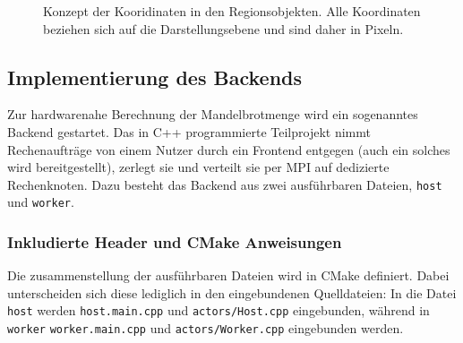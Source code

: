 \begin{figure}
	
\end{figure}
\begin{figure}
	\caption{Konzept der Kooridinaten in den Regionsobjekten. Alle Koordinaten beziehen sich auf die Darstellungsebene und sind daher in Pixeln.}
	\label{fig:concept_coordinates}
\end{figure}


\subsection{Implementierung des Backends}

Zur hardwarenahe Berechnung der Mandelbrotmenge wird ein sogenanntes Backend gestartet.
Das in C++ programmierte Teilprojekt nimmt Rechenaufträge von einem Nutzer durch ein Frontend entgegen (auch
ein solches wird bereitgestellt), zerlegt sie und verteilt sie per MPI auf dedizierte Rechenknoten.
Dazu besteht das Backend aus zwei ausführbaren Dateien, \verb|host| und \verb|worker|.

\subsubsection{Inkludierte Header und CMake Anweisungen}

Die zusammenstellung der ausführbaren Dateien wird in CMake definiert.
Dabei unterscheiden sich diese lediglich in den eingebundenen Quelldateien:
In die Datei \verb|host| werden \verb|host.main.cpp| und \verb|actors/Host.cpp| eingebunden, während
in \verb|worker| \verb|worker.main.cpp| und \verb|actors/Worker.cpp| eingebunden werden.

